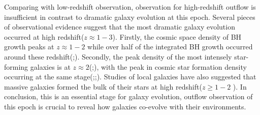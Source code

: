 \documentclass[../main.tex]{subfiles}
\begin{document}
Comparing with low-redshift observation, observation for high-redshift outflow is insufficient in contrast to dramatic galaxy evolution at this epoch. Several pieces of observational evidence suggest that the most dramatic galaxy evolution occurred at high redshift($z \approx 1-3$). Firstly, the cosmic space density of BH growth peaks at $z \approx 1-2$ while over half of the integrated BH growth occurred around these redshift(\cite{schmidt1983quasar};\cite{richards2006sloan}). Secondly, the peak density of the most intensely star-forming galaxies is at $z \approx 2$(\cite{chapman2005redshift};\cite{wardlow2011laboca}), with the peak in cosmic star formation density occurring at the same stage(\cite{madau1996high};\cite{lilly1999canada};\cite{madau2014cosmic}). Studies of local galaxies have also suggested that massive galaxies formed the bulk of their stars at high redshift($z \geqslant 1-2$ ). In conclusion, this is an essential stage for galaxy evolution, outflow observation of this epoch is crucial to reveal how galaxies co-evolve with their environments.  %

\end{document}
